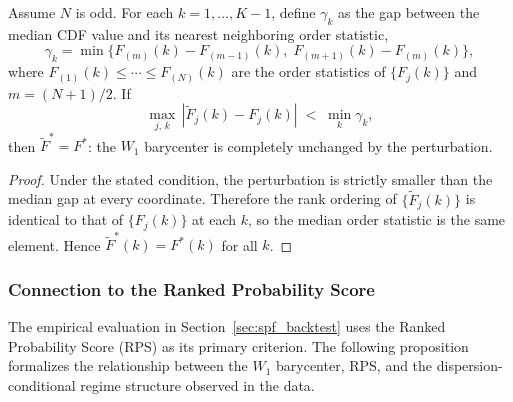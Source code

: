 \begin{corollary}
\label{cor:local_const}
Assume $N$ is odd.  For each $k = 1,\ldots,K-1$, define $\gamma_k$ as the gap between the median CDF value and its nearest neighboring order statistic,
\[
  \gamma_k = \min\bigl\{F_{(m)}(k) - F_{(m-1)}(k),\; F_{(m+1)}(k) - F_{(m)}(k)\bigr\},
\]
where $F_{(1)}(k)\leq\cdots\leq F_{(N)}(k)$ are the order statistics of $\{F_j(k)\}$ and $m = (N+1)/2$.  If
\[
  \max_{j,\,k}\,|\tilde F_j(k) - F_j(k)| \;<\; \min_k \gamma_k,
\]
then $\tilde F^* = F^*$: the $W_1$ barycenter is completely unchanged by the perturbation.
\end{corollary}
\begin{proof}
Under the stated condition, the perturbation is strictly smaller than the median gap at every coordinate.  Therefore the rank ordering of $\{\tilde F_j(k)\}$ is identical to that of $\{F_j(k)\}$ at each $k$, so the median order statistic is the same element.  Hence $\tilde F^*(k)=F^*(k)$ for all $k$.
\end{proof}

\subsubsection*{Connection to the Ranked Probability Score}

The empirical evaluation in Section~\ref{sec:spf_backtest} uses the Ranked Probability Score (RPS) as its primary criterion.  The following proposition formalizes the relationship between the $W_1$ barycenter, RPS, and the dispersion-conditional regime structure observed in the data.


